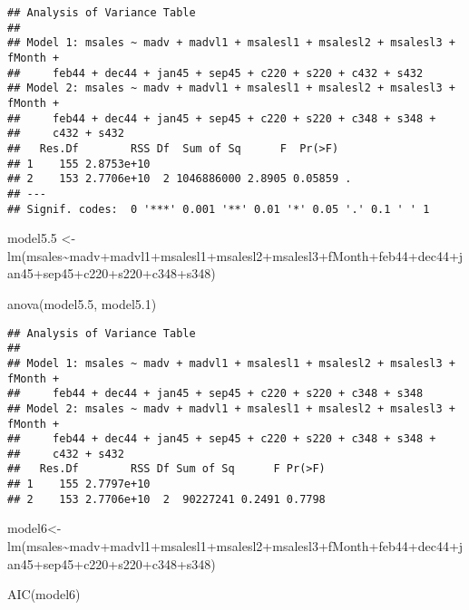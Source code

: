 \documentclass[
]{article}
\newenvironment{Shaded}{\begin{snugshade}}{\end{snugshade}}
\newcommand{\FloatTok}[1]{\textcolor[rgb]{0.00,0.00,0.81}{#1}}
\newcommand{\FunctionTok}[1]{\textcolor[rgb]{0.00,0.00,0.00}{#1}}
\newcommand{\NormalTok}[1]{#1}
\newcommand{\OtherTok}[1]{\textcolor[rgb]{0.56,0.35,0.01}{#1}}
\newcommand{\SpecialCharTok}[1]{\textcolor[rgb]{0.00,0.00,0.00}{#1}}
\begin{document}
\begin{verbatim}
## Analysis of Variance Table
## 
## Model 1: msales ~ madv + madvl1 + msalesl1 + msalesl2 + msalesl3 + fMonth + 
##     feb44 + dec44 + jan45 + sep45 + c220 + s220 + c432 + s432
## Model 2: msales ~ madv + madvl1 + msalesl1 + msalesl2 + msalesl3 + fMonth + 
##     feb44 + dec44 + jan45 + sep45 + c220 + s220 + c348 + s348 + 
##     c432 + s432
##   Res.Df        RSS Df  Sum of Sq      F  Pr(>F)  
## 1    155 2.8753e+10                               
## 2    153 2.7706e+10  2 1046886000 2.8905 0.05859 .
## ---
## Signif. codes:  0 '***' 0.001 '**' 0.01 '*' 0.05 '.' 0.1 ' ' 1
\end{verbatim}

\begin{Shaded}
\begin{Highlighting}[]
\NormalTok{model5}\FloatTok{.5} \OtherTok{\textless{}{-}} \FunctionTok{lm}\NormalTok{(msales}\SpecialCharTok{\textasciitilde{}}\NormalTok{madv}\SpecialCharTok{+}\NormalTok{madvl1}\SpecialCharTok{+}\NormalTok{msalesl1}\SpecialCharTok{+}\NormalTok{msalesl2}\SpecialCharTok{+}\NormalTok{msalesl3}\SpecialCharTok{+}\NormalTok{fMonth}\SpecialCharTok{+}\NormalTok{feb44}\SpecialCharTok{+}\NormalTok{dec44}\SpecialCharTok{+}\NormalTok{jan45}\SpecialCharTok{+}\NormalTok{sep45}\SpecialCharTok{+}\NormalTok{c220}\SpecialCharTok{+}\NormalTok{s220}\SpecialCharTok{+}\NormalTok{c348}\SpecialCharTok{+}\NormalTok{s348)}

\FunctionTok{anova}\NormalTok{(model5}\FloatTok{.5}\NormalTok{, model5}\FloatTok{.1}\NormalTok{)}
\end{Highlighting}
\end{Shaded}

\begin{verbatim}
## Analysis of Variance Table
## 
## Model 1: msales ~ madv + madvl1 + msalesl1 + msalesl2 + msalesl3 + fMonth + 
##     feb44 + dec44 + jan45 + sep45 + c220 + s220 + c348 + s348
## Model 2: msales ~ madv + madvl1 + msalesl1 + msalesl2 + msalesl3 + fMonth + 
##     feb44 + dec44 + jan45 + sep45 + c220 + s220 + c348 + s348 + 
##     c432 + s432
##   Res.Df        RSS Df Sum of Sq      F Pr(>F)
## 1    155 2.7797e+10                           
## 2    153 2.7706e+10  2  90227241 0.2491 0.7798
\end{verbatim}

\begin{Shaded}
\begin{Highlighting}[]
\NormalTok{model6}\OtherTok{\textless{}{-}} \FunctionTok{lm}\NormalTok{(msales}\SpecialCharTok{\textasciitilde{}}\NormalTok{madv}\SpecialCharTok{+}\NormalTok{madvl1}\SpecialCharTok{+}\NormalTok{msalesl1}\SpecialCharTok{+}\NormalTok{msalesl2}\SpecialCharTok{+}\NormalTok{msalesl3}\SpecialCharTok{+}\NormalTok{fMonth}\SpecialCharTok{+}\NormalTok{feb44}\SpecialCharTok{+}\NormalTok{dec44}\SpecialCharTok{+}\NormalTok{jan45}\SpecialCharTok{+}\NormalTok{sep45}\SpecialCharTok{+}\NormalTok{c220}\SpecialCharTok{+}\NormalTok{s220}\SpecialCharTok{+}\NormalTok{c348}\SpecialCharTok{+}\NormalTok{s348)}

\FunctionTok{AIC}\NormalTok{(model6)}
\end{Highlighting}
\end{Shaded}
\end{document}
